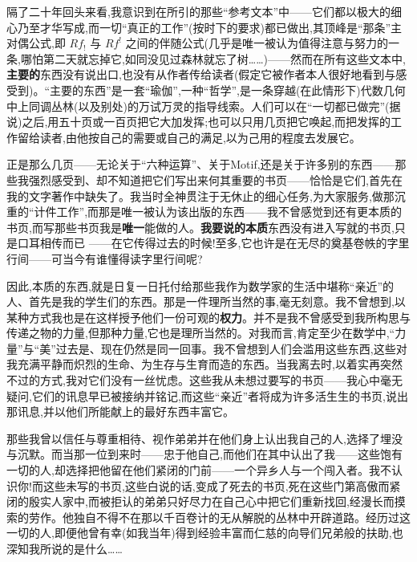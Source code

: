 \noindent 隔了二十年回头来看,我意识到在所引的那些“参考文本”中——它们都以极大的细心乃至才华写成,而一切“真正的工作”(按时下的要求)都已做出,其顶峰是“那条”主对偶公式,即 $Rf_{!}$ 与 $Rf^{!}$ 之间的伴随公式(几乎是唯一被认为值得注意与努力的一条,哪怕第二天就忘掉它,如同没见过森林就忘了树……)——然而在所有这些文本中,\textbf{主要的}东西没有说出口,也没有从作者传给读者(假定它被作者本人很好地看到与感受到)。“主要的东西”是一套“瑜伽”,一种“哲学”,是一条穿越(在此情形下)代数几何中上同调丛林(以及别处)的万试万灵的指导线索。人们可以在“一切都已做完”(据说)之后,用五十页或一百页把它大加发挥;也可以只用几页把它唤起,而把发挥的工作留给读者,由他按自己的需要或自己的满足,以为己用的程度去发展它。

\noindent 正是那么几页——无论关于“六种运算”、关于Motif,还是关于许多别的东西——那些我强烈感受到、却不知道把它们写出来何其重要的书页——恰恰是它们,首先在我的文字著作中缺失了。我当时全神贯注于无休止的细心任务,\dmark{}为大家服务,做那沉重的“计件工作”,而那是唯一被认为该出版的东西——我不曾感觉到还有更本质的书页,而写那些书页我是\textbf{唯一}能做的人。\textbf{我要说的本质}东西没有进入写就的书页,只是口耳相传而已
——在它传得过去的时候!至多,它也许是在无尽的奠基卷帙的字里行间——可当今有谁懂得读字里行间呢?

\noindent 因此,本质的东西,就是日复一日托付给那些我作为数学家的生活中堪称“亲近”的人、首先是我的学生们的东西。那是一件理所当然的事,毫无刻意。我不曾想到,以某种方式我也是在这样授予他们一份可观的\textbf{权力}。并不是我不曾感受到我所构思与传递之物的力量,但那种力量,它也是理所当然的。对我而言,肯定至少在数学中,“力量”与“美”过去是、现在仍然是同一回事。我不曾想到人们会滥用这些东西,这些对我充满平静而炽烈的生命、为生存与生育而造的东西。当我离去时,以着实再突然不过的方式,我对它们没有一丝忧虑。这些我从未想过要写的书页——我心中毫无疑问,它们的讯息早已被接纳并铭记,而这些“亲近”者将成为许多活生生的书页,说出那讯息,并以他们所能献上的最好东西丰富它。

\noindent 那些我曾以信任与尊重相待、视作弟弟并在他们身上认出我自己的人,选择了埋没与沉默。而当那一位到来时——忠于他自己,而他们在其中认出了我——这些饱有一切的人,却选择把他留在他们紧闭的门前——一个异乡人与一个闯入者。我不认识你!而这些未写的书页,这些白说的话,变成了死去的书页,死在这些门第高傲而紧闭的殷实人家中,而被拒认的弟弟只好尽力在自己心中把它们重新找回,经漫长而摸索的劳作。他独自不得不在那以千百卷计的无从解脱的丛林中开辟道路。经历过这一切的人,即便他曾有幸(如我当年)得到经验丰富而仁慈的向导们兄弟般的扶助,也深知我所说的是什么……

